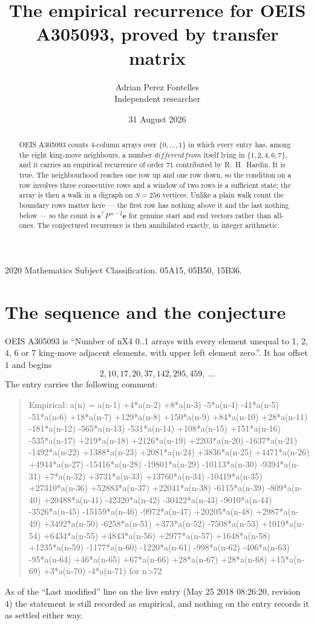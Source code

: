 \documentclass[11pt,a4paper]{article}
\title{The empirical recurrence for OEIS A305093, proved by transfer matrix}
\author{Adrian Perez Fontelles\\ \small Independent researcher}
\date{31 August 2026}
\theoremstyle{plain}
\theoremstyle{definition}
\begin{document}
\maketitle

\begin{abstract}
OEIS A305093 counts $4$-column arrays over $\{0,\dots,1\}$ in which every entry has,
among the eight king-move neighbours, a number $different from$ itself lying in $\{1,2,4,6,7\}$, and it carries an empirical
recurrence of order $71$ contributed by R.~H.~Hardin. It is true. The neighbourhood
reaches one row up and one row down, so the condition on a row involves three consecutive
rows and a window of two rows is a sufficient state; the array is then a walk in a digraph
on $S=256$ vertices. Unlike a plain walk count the boundary rows matter here --- the first
row has nothing above it and the last nothing below --- so the count is
$\mathbf{s}^{\!\top}P^{\,n-2}\mathbf{e}$ for genuine start and end vectors rather than
all-ones. The conjectured recurrence is then annihilated exactly, in integer arithmetic.
\end{abstract}

\noindent\small 2020 Mathematics Subject Classification. 05A15, 05B50, 15B36.\normalsize

\section{The sequence and the conjecture}

OEIS A305093 is ``Number of nX4 0..1 arrays with every element unequal to 1, 2, 4, 6 or 7 king-move adjacent elements, with upper left element zero.''. It has offset
$1$ and begins
\[
2, 10, 17, 20, 37, 142, 295, 459,\ \dots
\]
The entry carries the following comment:
\begin{quote}\small
Empirical: a(n) = a(n-1) +4*a(n-2) +8*a(n-3) -5*a(n-4) -41*a(n-5) -51*a(n-6) +18*a(n-7) +129*a(n-8) +150*a(n-9) +84*a(n-10) +28*a(n-11) -181*a(n-12) -565*a(n-13) -531*a(n-14) +108*a(n-15) +151*a(n-16) -535*a(n-17) +219*a(n-18) +2126*a(n-19) +2203*a(n-20) -1637*a(n-21) -1492*a(n-22) +1388*a(n-23) +2081*a(n-24) +3836*a(n-25) +4471*a(n-26) +4944*a(n-27) -15416*a(n-28) -19801*a(n-29) -10113*a(n-30) -9394*a(n-31) +7*a(n-32) +3731*a(n-33) +13760*a(n-34) -10419*a(n-35) +27310*a(n-36) +52883*a(n-37) +22041*a(n-38) -6115*a(n-39) -809*a(n-40) +20488*a(n-41) -42320*a(n-42) -30422*a(n-43) -9010*a(n-44) -3526*a(n-45) -15159*a(n-46) -9972*a(n-47) +20205*a(n-48) +2987*a(n-49) +3492*a(n-50) -6258*a(n-51) +373*a(n-52) -7508*a(n-53) +1019*a(n-54) +6434*a(n-55) +4843*a(n-56) +2977*a(n-57) +1648*a(n-58) +1235*a(n-59) -1177*a(n-60) -1220*a(n-61) -998*a(n-62) -406*a(n-63) -95*a(n-64) +46*a(n-65) +67*a(n-66) +28*a(n-67) +28*a(n-68) +15*a(n-69) +3*a(n-70) -4*a(n-71) for n>72
\end{quote}
As of the ``Last modified'' line on the live entry (May 25 2018 08:26:20, revision
4) the statement is still recorded as empirical, and nothing on the entry
records it as settled either way.
\end{document}
